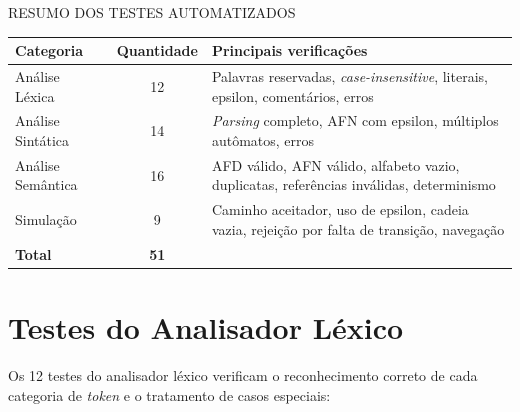 \documentclass[
    12pt
    ,oneside
    ,a4paper
    ,chapter=TITLE
    ,section=TITLE
    ,sumario=abnt-6027-2012]{abntex2}
\begin{document}
\begin{quadro}[h]
    \centering
    \caption{RESUMO DOS TESTES AUTOMATIZADOS}
    \label{quad:resumo-testes}
    \small
    \begin{tabularx}{\textwidth}{|l|c|Z|}
        \hline
        \textbf{Categoria} & \textbf{Quantidade} & \textbf{Principais verificações} \\
        \hline
        Análise Léxica    & 12  & Palavras reservadas, \textit{case-insensitive}, literais, epsilon, comentários, erros \\
        \hline
        Análise Sintática & 14  & \textit{Parsing} completo, AFN com epsilon, múltiplos autômatos, erros \\
        \hline
        Análise Semântica & 16  & AFD válido, AFN válido, alfabeto vazio, duplicatas, referências inválidas, determinismo \\
        \hline
        Simulação         & 9   & Caminho aceitador, uso de epsilon, cadeia vazia, rejeição por falta de transição, navegação \\
        \hline
        \textbf{Total}    & \textbf{51} &  \\
        \hline
    \end{tabularx}
\end{quadro}

\section{Testes do Analisador Léxico}
\label{sec:res-lexer}

Os 12 testes do analisador léxico verificam o reconhecimento correto de cada categoria
de \textit{token} e o tratamento de casos especiais:
\end{document}
